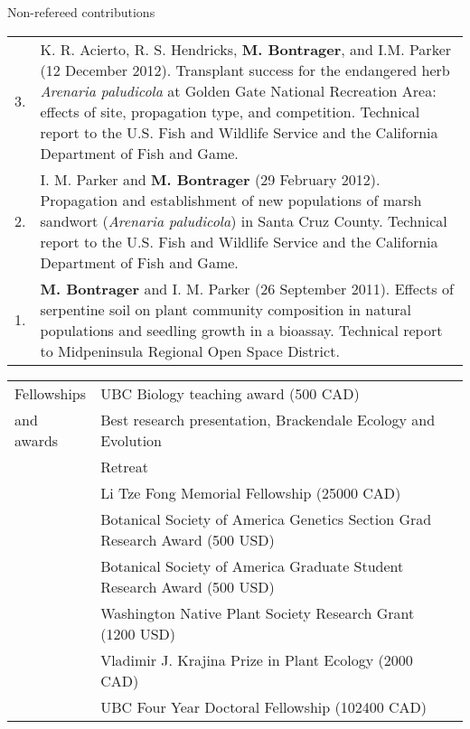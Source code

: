 \documentclass[letterpaper,11pt,oneside]{article}
\begin{document}

\noindent\Large{Non-refereed contributions}  
\normalsize
\bigskip

\bgroup
\def\arraystretch{1.2}
\noindent \begin{tabular}{@{} p{1cm} >{\raggedright\arraybackslash}p{15.11cm}}
3. & K. R. Acierto, R. S. Hendricks, \textbf{M. Bontrager}, and I.M. Parker (12 December 2012). Transplant success for the endangered herb \textit{Arenaria paludicola} at Golden Gate National Recreation Area: effects of site, propagation type, and competition. Technical report to the U.S. Fish and Wildlife Service and the California Department of Fish and Game. \\
2. & I. M. Parker and \textbf{M. Bontrager} (29 February 2012). Propagation and establishment of new populations of marsh sandwort (\textit{Arenaria paludicola}) in Santa Cruz County. Technical report to the U.S. Fish and Wildlife Service and the California Department of Fish and Game. \\
1. & \textbf{M. Bontrager} and I. M. Parker (26 September 2011). Effects of serpentine soil on plant community composition in natural populations and seedling growth in a bioassay. Technical report to Midpeninsula Regional Open Space District. \\
\end{tabular}
\egroup
\bigskip
\bigskip






\normalsize
\noindent \begin{tabular}{@{} p{3cm} >{\raggedright\arraybackslash}p{11.71cm} >{\raggedleft\arraybackslash}p{1.2cm}}
\Large{Fellowships} & UBC Biology teaching award (500 CAD) & 2018 \\
\Large{and awards} & Best research presentation, Brackendale Ecology and Evolution & 2016 \\
 & Retreat & \\
 & Li Tze Fong Memorial Fellowship (25000 CAD) & 2016 \\
 & Botanical Society of America Genetics Section Grad Research Award (500 USD) & 2016 \\
 & Botanical Society of America Graduate Student Research Award (500 USD) & 2016 \\
 & Washington Native Plant Society Research Grant (1200 USD) & 2016 \\
 & Vladimir J. Krajina Prize in Plant Ecology (2000 CAD) & 2013 \\
 & UBC Four Year Doctoral Fellowship (102400 CAD) & 2012 \\
\end{tabular}
\bigskip
\bigskip
 
\end{document}
